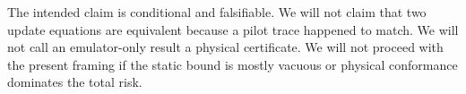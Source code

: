 The intended claim is conditional and falsifiable. We will not claim that two
update equations are equivalent because a pilot trace happened to match. We will
not call an emulator-only result a physical certificate. We will not proceed with
the present framing if the static bound is mostly vacuous or physical conformance
dominates the total risk.

